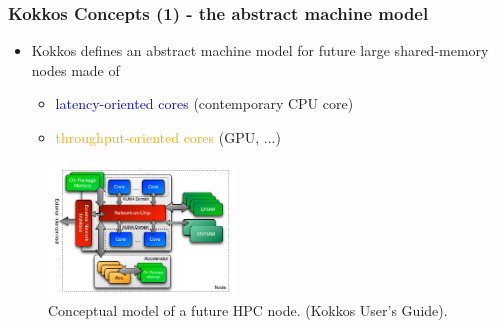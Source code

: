 \begin{frame}
  \frametitle{Kokkos Concepts (1) - the abstract machine model}

  \begin{itemize}
  \item Kokkos defines an abstract machine model for future large shared-memory nodes made of 
    \begin{itemize}
    \item \textcolor{blue}{latency-oriented cores} (contemporary CPU core)
    \item \textcolor{orange}{throughput-oriented cores} (GPU, ...)
    \end{itemize}
  \end{itemize}

  \begin{center}
    \begin{figure}
      \includegraphics[width=5cm]{images/kokkos_machine_model}
      \caption{Conceptual model of a future HPC node. (Kokkos User's Guide).}
      \end{figure}
  \end{center}

\end{frame}


